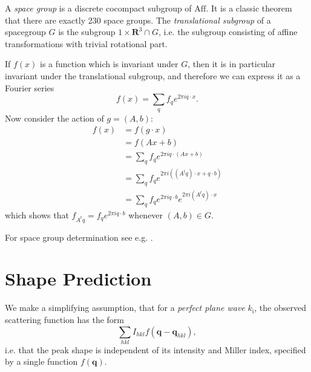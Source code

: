 \documentclass[11pt,a4paper]{article}
\def\v#1{\bm{{#1}}}
\def\si{\text{i}}
\def\q{{\v{q}}}
\begin{document}
A \emph{space group} is a discrete cocompact subgroup of $\mathrm{Aff}$. It is a classic theorem that there are exactly 230 space groups.
The \emph{translational subgroup} of a spacegroup $G$ is the subgroup ${1} \times \mathbf{R}^3 \cap G$, i.e. the subgroup consisting of
affine transformations with trivial rotational part.

If $f(x)$ is a function which is invariant under $G$, then it
is in particular invariant under the translational subgroup, and therefore we can express it as a Fourier series
\begin{equation} f(x) = \sum_q f_q e^{2\pi i q \cdot x}. \end{equation}
Now consider the action of $g = (A,b)$:
\begin{align}
  f(x)
  &= f(g\cdot x) \\
  &= f(Ax + b) \\
  &= \sum_q f_q e^{2\pi i q \cdot (Ax + b)} \\
  &= \sum_q f_q e^{2\pi i ((A^t q) \cdot x + q \cdot b)} \\
  &= \sum_q f_q e^{2 \pi i q \cdot b} e^{2\pi i (A^t q) \cdot x}
\end{align}
which shows that $f_{A^t q} = f_{q} e^{2 \pi i q \cdot b}$ whenever $(A,b) \in G$.


For space group determination see e.g. \cite{Eva11,Kab10b}.


\section{Shape Prediction} \label{peak-prediction}

We make a simplifying assumption, that for a \emph{perfect plane wave} $k_\si$, the observed scattering function has the form
\begin{equation} \sum_{hkl} I_{hkl} f(\q - \q_{hkl}), \end{equation}
i.e. that the peak shape is independent of its intensity and Miller index, specified by a single function $f(\q)$.
\end{document}
